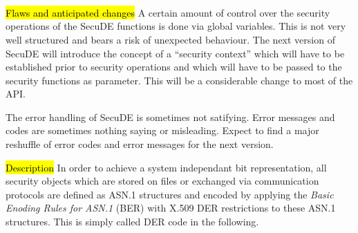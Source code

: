  \\
 \\
 \\
 \\
 \\
 \\
 \\
 \\
 \\
 \\
 \\
 \\
 \\

\hl{Flaws and anticipated changes}
A certain amount of control over the security operations of the SecuDE
functions is done via global variables. This is not very well structured
and bears a risk of unexpected behaviour. The next version of SecuDE
will introduce the concept of a  ``security context'' which will have 
to be established prior to security operations and which will have to be passed
to the security functions as parameter. This will be a considerable change
to most of the API.

The error handling of SecuDE is sometimes not satifying. Error messages and codes
are sometimes nothing saying or misleading. Expect to find a major reshuffle
of error codes and error messages for the next version.

\label{intro4}
\hl{Description}
In order to achieve a system independant bit representation, all security 
objects 
which are stored on files or exchanged via communication protocols are 
defined as ASN.1 structures and encoded by applying
the {\em Basic Enoding Rules for ASN.1} (BER) with X.509 DER restrictions 
to these 
ASN.1 structures. This is simply called DER code in the following. 

